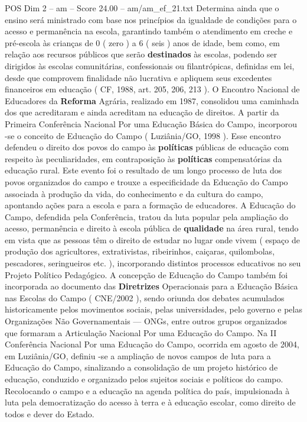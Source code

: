 \begin{textsample}{POS Dim 2 – am – Score 24.00 – am/am\_ef\_21.txt}
Determina ainda que o ensino será ministrado com base nos princípios da igualdade de condições para o acesso e permanência na escola, garantindo também o atendimento em creche e pré-escola às crianças de 0 ( zero ) a 6 ( seis ) anos de idade, bem como, em relação aos recursos públicos que serão \textbf{destinados} às escolas, podendo ser dirigidos às escolas comunitárias, confessionais ou filantrópicas, definidas em lei, desde que comprovem finalidade não lucrativa e apliquem seus excedentes financeiros em educação ( CF, 1988, art. 205, 206, 213 ).
O Encontro Nacional de Educadores da \textbf{Reforma} Agrária, realizado em 1987, consolidou uma caminhada dos que acreditaram e ainda acreditam na educação de direitos.
A partir da Primeira Conferência Nacional Por uma Educação Básica do Campo, incorporou -se o conceito de Educação do Campo ( Luziânia/GO, 1998 ).
Esse encontro defendeu o direito dos povos do campo às \textbf{políticas} públicas de educação com respeito às peculiaridades, em contraposição às \textbf{políticas} compensatórias da educação rural.
Este evento foi o resultado de um longo processo de luta dos povos organizados do campo e trouxe a especificidade da Educação do Campo associada à produção da vida, do conhecimento e da cultura do campo, apontando ações para a escola e para a formação de educadores.
A Educação do Campo, defendida pela Conferência, tratou da luta popular pela ampliação do acesso, permanência e direito à escola pública de \textbf{qualidade} na área rural, tendo em vista que as pessoas têm o direito de estudar no lugar onde vivem ( espaço de produção dos agricultores, extrativistas, ribeirinhos, caiçaras, quilombolas, pescadores, seringueiros etc. ), incorporando distintos processos educativos no seu Projeto Político Pedagógico.
A concepção de Educação do Campo também foi incorporada ao documento das \textbf{Diretrizes} Operacionais para a Educação Básica nas Escolas do Campo ( CNE/2002 ), sendo oriunda dos debates acumulados historicamente pelos movimentos sociais, pelas universidades, pelo governo e pelas Organizações Não Governamentais — ONGs, entre outros grupos organizados que formaram a Articulação Nacional Por uma Educação do Campo.
Na II Conferência Nacional Por uma Educação do Campo, ocorrida em agosto de 2004, em Luziânia/GO, definiu -se a ampliação de novos campos de luta para a Educação do Campo, sinalizando a consolidação de um projeto histórico de educação, conduzido e organizado pelos sujeitos sociais e políticos do campo.
Recolocando o campo e a educação na agenda política do país, impulsionada à luta pela democratização do acesso à terra e à educação escolar, como direito de todos e dever do Estado.

\end{textsample}
